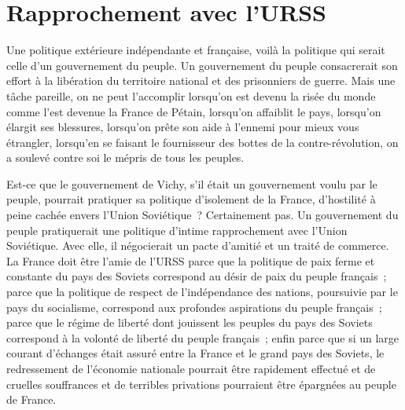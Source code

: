 \documentclass[french,twoside]{book} %
\begin{document}
\section[Rapprochement avec l’URSS]{Rapprochement avec l’URSS}
\noindent Une politique extérieure indépendante et française, voilà la politique qui serait celle d’un gouvernement du peuple. Un gouvernement du peuple consacrerait son effort à la libération du territoire national et des prisonniers de guerre. Mais une tâche pareille, on ne peut l’accomplir lorsqu’on est devenu la risée du monde comme l’est devenue la France de Pétain, lorsqu’on affaiblit le pays, lorsqu’on élargit ses blessures, lorsqu’on prête son aide à l’ennemi pour mieux vous étrangler, lorsqu’en se faisant le fournisseur des bottes de la contre-révolution, on a soulevé contre soi le mépris de tous les peuples.\par
Est-ce que le gouvernement de Vichy, s’il était un gouvernement voulu par le peuple, pourrait pratiquer sa politique d’isolement de la France, d’hostilité à peine cachée envers l’Union Soviétique ? Certainement pas. Un gouvernement du peuple pratiquerait une politique d’intime rapprochement avec l’Union Soviétique. Avec elle, il négocierait un pacte d’amitié et un traité de commerce. La France doit être l’amie de l’URSS parce que la politique de paix ferme et constante du pays des Soviets correspond au désir de paix du peuple français ; parce que la politique de respect de l’indépendance des nations, poursuivie par le pays du socialisme, correspond aux profondes aspirations du peuple français ; parce que le régime de liberté dont jouissent les peuples du pays des Soviets correspond à la volonté de liberté du peuple français ; enfin parce que si un large courant d’échanges était assuré entre la France et le grand pays des Soviets, le redressement de l’économie nationale pourrait être rapidement effectué et de cruelles souffrances et de terribles privations pourraient être épargnées au peuple de France.
\end{document}
